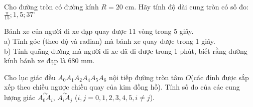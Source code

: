 \begin{bt}%
Cho đường tròn có đường kính $R=20$ cm. Hãy tính độ dài cung  tròn có số đo: $\displaystyle  \frac{\pi}{15}; 1,5; 37^\circ$
\end{bt}

\begin{bt}%
Bánh xe của người đi xe đạp quay được 11 vòng trong 5 giây.\\
a) 	Tính góc (theo độ và rađian) mà bánh xe quay được trong 1 giây.\\
b) 	Tính quãng đường mà người đi xe đã đi được trong 1 phút, biết rằng đường kính bánh xe đạp là 680 mm.
\end{bt}

\begin{bt}%
Cho lục giác đều $A_0A_1A_2A_4A_5A_6$ nội tiếp đường tròn tâm $O$(các đỉnh được sắp xếp theo chiều ngược chiều quay của kim đồng hồ). Tính số đo của các cung lượng giác $\overset{\curvearrowright}{A_0  A_i}$, $\overset{\curvearrowright}{A_i A_j}$ ($i,j=0,1,2,3,4,5,i\ne j$).
\end{bt}

